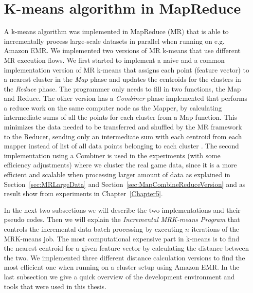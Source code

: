 \section{K-means algorithm in MapReduce}
A k-means algorithm was implemented in MapReduce (MR) that is able to incrementally process large-scale datasets in parallel when running on e.g. Amazon EMR. We implemented two versions of MR k-means that use different MR execution flows. We first started to implement a naive and a common implementation version of MR k-means that assigns each point (feature vector) to a nearest cluster in the \textit{Map} phase and updates the centroids for the clusters in the \textit{Reduce} phase. The programmer only needs to fill in two functions, the Map and Reduce. The other version has a \textit{Combiner} phase implemented that performs a reduce work on the same computer node as the Mapper, by calculating intermediate sums of all the points for each cluster from a Map function. This minimizes the data needed to be transferred and shuffled by the MR framework to the Reducer, sending only an intermediate sum with each centroid from each mapper instead of list of all data points belonging to each cluster \citep{Dean:2004}. The second implementation using a Combiner is used in the experiments (with some efficiency adjustments) where we cluster the real game data, since it is a more efficient and scalable when processing larger amount of data as explained in Section~\ref{sec:MRLargeData} and Section~\ref{sec:MapCombineReduceVersion} and as result show from experiments in Chapter~\ref{Chapter5}.

In the next two subsections we will describe the two implementations and their pseudo codes. Then we will explain the \textit{Incremental MRK-means Program} that controls the incremental data batch processing by executing $n$ iterations of the MRK-means job. The most computational expensive part in k-means is to find the nearest centroid for a given feature vector by calculating the distance between the two. We implemented three different distance calculation versions to find the most efficient one when running on a cluster setup using Amazon EMR. In the last subsection  we give a quick overview of the development environment and tools that were used in this thesis.

